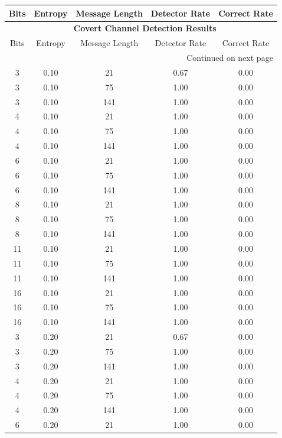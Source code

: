 \documentclass[10pt,a4paper]{article}
\begin{document}
\begin{center}
\begin{longtable}{ccccc}
\toprule
Bits & Entropy & Message Length & Detector Rate & Correct Rate \\
\midrule
\endfirsthead

\multicolumn{5}{c}{{\bfseries \tablename\ \thetable{} Covert Channel Detection Results}} \\
\toprule
Bits & Entropy & Message Length & Detector Rate & Correct Rate \\
\midrule
\endhead

\midrule \multicolumn{5}{r}{{Continued on next page}} \\
\endfoot

\bottomrule
\endlastfoot

3  & 0.10 & 21  & 0.67 & 0.00 \\
3  & 0.10 & 75  & 1.00 & 0.00 \\
3  & 0.10 & 141 & 1.00 & 0.00 \\
4  & 0.10 & 21  & 1.00 & 0.00 \\
4  & 0.10 & 75  & 1.00 & 0.00 \\
4  & 0.10 & 141 & 1.00 & 0.00 \\
6  & 0.10 & 21  & 1.00 & 0.00 \\
6  & 0.10 & 75  & 1.00 & 0.00 \\
6  & 0.10 & 141 & 1.00 & 0.00 \\
8  & 0.10 & 21  & 1.00 & 0.00 \\
8  & 0.10 & 75  & 1.00 & 0.00 \\
8  & 0.10 & 141 & 1.00 & 0.00 \\
11 & 0.10 & 21  & 1.00 & 0.00 \\
11 & 0.10 & 75  & 1.00 & 0.00 \\
11 & 0.10 & 141 & 1.00 & 0.00 \\
16 & 0.10 & 21  & 1.00 & 0.00 \\
16 & 0.10 & 75  & 1.00 & 0.00 \\
16 & 0.10 & 141 & 1.00 & 0.00 \\
3  & 0.20 & 21  & 0.67 & 0.00 \\
3  & 0.20 & 75  & 1.00 & 0.00 \\
3  & 0.20 & 141 & 1.00 & 0.00 \\
4  & 0.20 & 21  & 1.00 & 0.00 \\
4  & 0.20 & 75  & 1.00 & 0.00 \\
4  & 0.20 & 141 & 1.00 & 0.00 \\
6  & 0.20 & 21  & 1.00 & 0.00 \\

\end{longtable}
\end{center}
\end{document}
